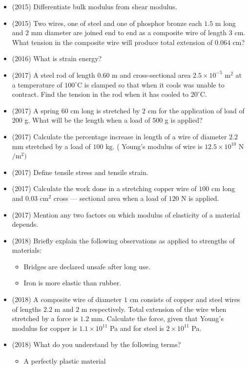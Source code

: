 \documentclass{article}
\begin{document}
\begin{itemize}
\item (2015)  Differentiate bulk modulus from shear modulus.
\item (2015)  Two wires, one of steel and one of phosphor bronze each $ 1.5$ m long and $ 2$ mm diameter are joined end to end as a composite wire of length $ 3$ cm.  What tension in the composite wire will produce total extension of $ 0.064$ cm?
\item (2016)  What is strain energy?
\item (2017)  A steel rod of length $ 0.60$ m and cross-sectional area $ 2.5 \times 10^{-5}$ m$ ^{2}$ at a temperature of $ 100^{\circ}$C is clamped so that when it cools was unable to contract. Find the tension in the rod when it has cooled to $ 20^{\circ}$C. 
\item (2017)  A spring $ 60$ cm long is stretched by $ 2$ cm for the application of load of $ 200$ g. What will be the length when a load of $ 500$ g is applied? 
\item (2017)  Calculate the percentage increase in length of a wire of diameter $ 2.2$ mm stretched by a load of $ 100$ kg. ( Young's modulus of wire is $ 12.5 \times 10^{10}$ N$/$m$ ^{2})$
\item (2017)  Define tensile stress and tensile strain. 
\item (2017)  Calculate the work done in a stretching copper wire of $ 100$ cm long and $ 0.03 $ cm$ ^{2}$ cross — sectional area when a load of $ 120$ N is applied. 
\item (2017)  Mention any two factors on which modulus of elasticity of a material depends.
\item (2018)  Briefly explain the following observations as applied to strengths of materials:\begin{itemize}
\item Bridges are declared unsafe after long use. 
\item Iron is more elastic than rubber. 
\end{itemize}
\item (2018)  A composite wire of diameter $ 1$ cm consists of copper and steel wires of lengths $ 2.2$ m and $ 2$ m respectively. Total extension of the wire when stretched by a force is $ 1.2$ mm. Calculate the force, given that Young’s modulus for copper is $ 1.1 \times 10^{11}$ Pa and for steel is $ 2 \times 10^{11}$ Pa. 
\item (2018)  What do you understand by the following terms?\begin{itemize}
\item A perfectly plastic material 

\end{itemize}
\end{itemize}
\end{document}
